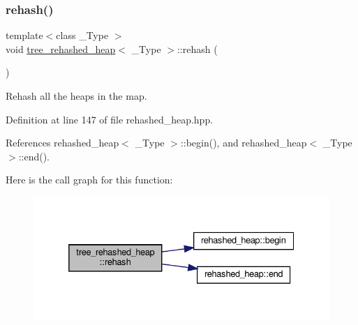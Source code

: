 \subsubsection{\texorpdfstring{rehash()}{rehash()}}
{\footnotesize\ttfamily template$<$class \+\_\+\+Type $>$ \\
void \hyperlink{structtree__rehashed__heap}{tree\+\_\+rehashed\+\_\+heap}$<$ \+\_\+\+Type $>$\+::rehash (\begin{DoxyParamCaption}{ }\end{DoxyParamCaption})\hspace{0.3cm}{\ttfamily [inline]}}



Rehash all the heaps in the map. 



Definition at line 147 of file rehashed\+\_\+heap.\+hpp.



References rehashed\+\_\+heap$<$ \+\_\+\+Type $>$\+::begin(), and rehashed\+\_\+heap$<$ \+\_\+\+Type $>$\+::end().

Here is the call graph for this function\+:
\nopagebreak
\begin{figure}[H]
\begin{center}
\leavevmode
\includegraphics[width=332pt]{de/d91/structtree__rehashed__heap_a8d1fb20436b37ebc2595c2e6d8eb3fd1_cgraph}
\end{center}
\end{figure}
\mbox{\label{structtree__rehashed__heap_ae71af5931de670e3b2d159c70e9e4a4e}} 
